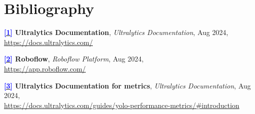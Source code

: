 \documentclass[../main]{subfiles}
\begin{document}
\chapter{Bibliography}

{
\hypersetup{linkcolor=black}
\minitoc
}

\hypertarget{target:zona}{}


{\bfseries \hyperlink{target:zona}{\textcolor{blue}{[1]}} Ultralytics Documentation}, \emph{Ultralytics Documentation}, Aug 2024, \\
\hspace{2em} \url{https://docs.ultralytics.com/}

{\bfseries \hyperlink{target:zona}{\textcolor{blue}{[2]}} Roboflow}, \emph{Roboflow Platform}, Aug 2024, \\
\hspace{2em} \url{https://app.roboflow.com/}

{\bfseries \hyperlink{target:zona}{\textcolor{blue}{[3]}} Ultralytics Documentation for metrics}, \emph{Ultralytics Documentation}, Aug 2024, \\
\hspace{2em} \url{https://docs.ultralytics.com/guides/yolo-performance-metrics/#introduction}
\end{document}
